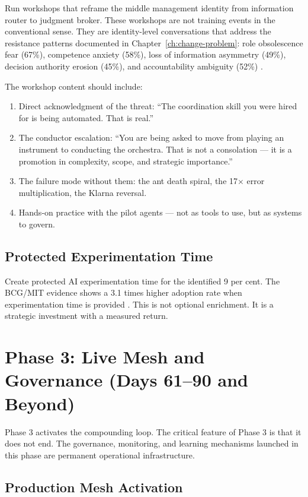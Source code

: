 Run workshops that reframe the middle management identity from information router to judgment broker. These workshops are not training events in the conventional sense. They are identity-level conversations that address the resistance patterns documented in Chapter~\ref{ch:change-problem}: role obsolescence fear (67\%), competence anxiety (58\%), loss of information asymmetry (49\%), decision authority erosion (45\%), and accountability ambiguity (52\%) \parencite{Capgemini2025}.

The workshop content should include:

\begin{enumerate}
  \item Direct acknowledgment of the threat: ``The coordination skill you were hired for is being automated. That is real.''
  \item The conductor escalation: ``You are being asked to move from playing an instrument to conducting the orchestra. That is not a consolation --- it is a promotion in complexity, scope, and strategic importance.''
  \item The failure mode without them: the ant death spiral, the 17$\times$ error multiplication, the Klarna reversal.
  \item Hands-on practice with the pilot agents --- not as tools to use, but as systems to govern.
\end{enumerate}

\subsection{Protected Experimentation Time}

Create protected AI experimentation time for the identified 9 per cent. The BCG/MIT evidence shows a 3.1 times higher adoption rate when experimentation time is provided \parencite{BCGAIKPIs2025}. This is not optional enrichment. It is a strategic investment with a measured return.

\section{Phase 3: Live Mesh and Governance (Days 61--90 and Beyond)}

Phase 3 activates the compounding loop. The critical feature of Phase 3 is that it does not end. The governance, monitoring, and learning mechanisms launched in this phase are permanent operational infrastructure.

\subsection{Production Mesh Activation}

